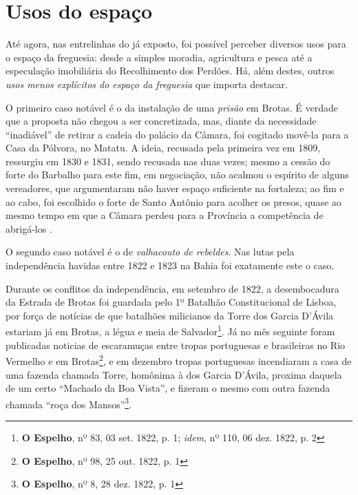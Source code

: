 \section{Usos do espaço}\label{sec:2.4}

Até agora, nas entrelinhas do já exposto, foi possível perceber diversos usos para o espaço da freguesia: desde a simples moradia, agricultura e pesca até a especulação imobiliária do Recolhimento dos Perdões. Há, além destes, outros \textit{usos menos explícitos do espaço da freguesia} que importa destacar.

O primeiro caso notável é o da instalação de uma \textit{prisão} em Brotas. É verdade que a proposta não chegou a ser concretizada, mas, diante da necessidade ``inadiável'' de retirar a cadeia do palácio da Câmara, foi cogitado movê-la para a Casa da Pólvora, no Matatu. A ideia, recusada pela primeira vez em 1809, ressurgiu em 1830 e 1831, sendo recusada nas duas vezes; mesmo a cessão do forte do Barbalho para este fim, em negociação, não acalmou o espírito de alguns vereadores, que argumentaram não haver espaço suficiente na fortaleza; ao fim e ao cabo, foi escolhido o forte de Santo Antônio para acolher os presos, quase ao mesmo tempo em que a Câmara perdeu para a Província a competência de abrigá-los \cite[pp.~304-305]{ruy_camara_1953}.

O segundo caso notável é o de \textit{valhacouto de rebeldes}. Nas lutas pela independência havidas entre 1822 e 1823 na Bahia foi exatamente este o caso. 

Durante os conflitos da independência, em setembro de 1822, a desembocadura da Estrada de Brotas foi guardada pelo 1º Batalhão Constitucional de Lisboa, por força de notícias de que batalhões milicianos da Torre dos Garcia D'Ávila estariam já em Brotas, a légua e meia de Salvador\footnote{\textbf{O Espelho}, nº 83, 03 set. 1822, p. 1; \textit{idem}, nº 110, 06 dez. 1822, p. 2}. Já no mês seguinte foram publicadas noticias de escaramuças entre tropas portuguesas e brasileiras no Rio Vermelho e em Brotas\footnote{\textbf{O Espelho}, nº 98, 25 out. 1822, p. 1}, e em dezembro tropas portuguesas incendiaram a casa de uma fazenda chamada Torre, homônima à dos Garcia D'Ávila, proxima daquela de um certo ``Machado da Boa Vista'', e fizeram o mesmo com outra fazenda chamada ``roça dos Mansos''\footnote{\textbf{O Espelho}, nº 8, 28 dez. 1822, p. 1}.

